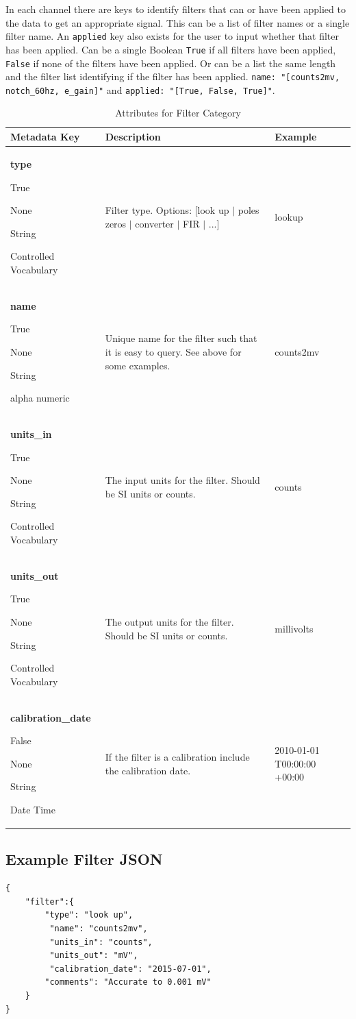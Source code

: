 \documentclass[12pt]{article}
\newcommand{\entry}[7]{
	\textbf{#1} 
	\begin{itemize}[topsep=5pt,itemsep=-.1pt,parsep=-2pt,partopsep=0pt,labelwidth=2em,align=left,itemindent=1em]
		\begin{small}
			\item[Required:] #2
			\item[Units:] #3
			\item[Type:] #4
			\item[Style:] #5
		\end{small}
	\end{itemize} & #6 & #7 \\ \midrule}
\begin{document}
In each channel there are keys to identify filters that can or have been applied to the data to get an appropriate signal.  This can be a list of filter names or a single filter name.  An \verb|applied| key also exists for the user to input whether that filter has been applied.  Can be a single Boolean \verb|True| if all filters have been applied, \verb|False| if none of the filters have been applied.  Or can be a list the same length and the filter list identifying if the filter has been applied.  \verb|name: "[counts2mv, notch_60hz, e_gain]"| and \verb|applied: "[True, False, True]"|. 

\begin{table}[h!]
	\caption[Attributes for Filter Category]{Attributes for Filter Category}
	\begin{tabular}{p{}>{\raggedright}p{}p{}}
		\textbf{Metadata Key} & \textbf{Description} & \textbf{Example} \\ \toprule
		\entry{type}{True}{None}{String}{Controlled Vocabulary}{Filter type. Options: [look up $|$ poles zeros $|$ converter $|$ FIR $|$ ...] }{lookup}
		\entry{name}{True}{None}{String}{alpha numeric}{Unique name for the filter such that it is easy to query.  See above for some examples.}{counts2mv}
		\entry{units\_in}{True}{None}{String}{Controlled Vocabulary}{The input units for the filter. Should be SI units or counts.}{counts}
		\entry{units\_out}{True}{None}{String}{Controlled Vocabulary}{The output units for the filter. Should be SI units or counts.}{millivolts}
		\entry{calibration\_date}{False}{None}{String}{Date Time}{If the filter is a calibration include the calibration date.}{2010-01-01 T00:00:00 +00:00}
		
	\end{tabular}
	\label{tab:filter}
\end{table}

\subsection{Example Filter JSON} 

\begin{verbatim}
{
    "filter":{
        "type": "look up",
         "name": "counts2mv",
         "units_in": "counts",
         "units_out": "mV",
         "calibration_date": "2015-07-01",
        "comments": "Accurate to 0.001 mV"
    }
}
\end{verbatim}

\clearpage
\newpage
\end{document}
